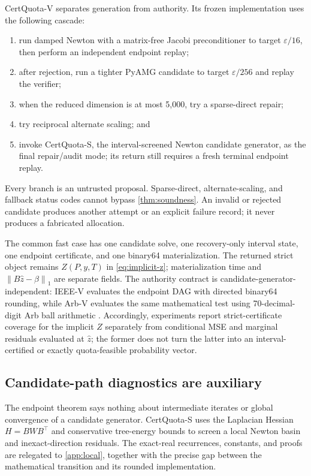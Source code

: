 \documentclass[smallextended,envcountsect]{svjour3}
\newcommand{\norm}[1]{\left\lVert#1\right\rVert}
\begin{document}
CertQuota-V separates generation from authority.  Its frozen implementation uses
the following cascade:
\begin{enumerate}[leftmargin=*,itemsep=2pt]
 \item run damped Newton with a matrix-free Jacobi preconditioner to target
 $\varepsilon/16$, then perform an independent endpoint replay;
 \item after rejection, run a tighter PyAMG candidate \citep{bell2023pyamg} to target
 $\varepsilon/256$ and replay the verifier;
 \item when the reduced dimension is at most 5,000, try a sparse-direct repair;
 \item try reciprocal alternate scaling; and
 \item invoke CertQuota-S, the interval-screened Newton candidate generator,
 as the final repair/audit mode; its return still requires a fresh terminal
 endpoint replay.
\end{enumerate}
Every branch is an untrusted proposal.  Sparse-direct, alternate-scaling, and
fallback status codes cannot bypass \cref{thm:soundness}.  An invalid or rejected
candidate produces another attempt or an explicit failure record; it never
produces a fabricated allocation.

The common fast case has one candidate solve, one recovery-only interval state,
one endpoint certificate, and one binary64 materialization.  The returned strict
object remains $Z(P,y,T)$ in \cref{eq:implicit-z}; materialization time and
$\norm{B\widehat z-\beta}_1$ are separate fields.  The authority contract is
candidate-generator-independent: IEEE-V evaluates the endpoint DAG with directed binary64 rounding,
while Arb-V evaluates the same mathematical test using 70-decimal-digit Arb ball
arithmetic \citep{johansson2017arb}.
Accordingly, experiments report strict-certificate coverage for the implicit
$Z$ separately from conditional MSE and marginal residuals evaluated at
$\widehat z$; the former does not turn the latter into an interval-certified or
exactly quota-feasible probability vector.

\subsection{Candidate-path diagnostics are auxiliary}

The endpoint theorem says nothing about intermediate iterates or global
convergence of a candidate generator.  CertQuota-S uses the Laplacian Hessian
$H=BW B^\top$ and conservative tree-energy bounds to screen a local Newton
basin and inexact-direction residuals.  The exact-real recurrences, constants,
and proofs are relegated to \cref{app:local}, together with the precise gap
between the mathematical transition and its rounded implementation.
\end{document}
